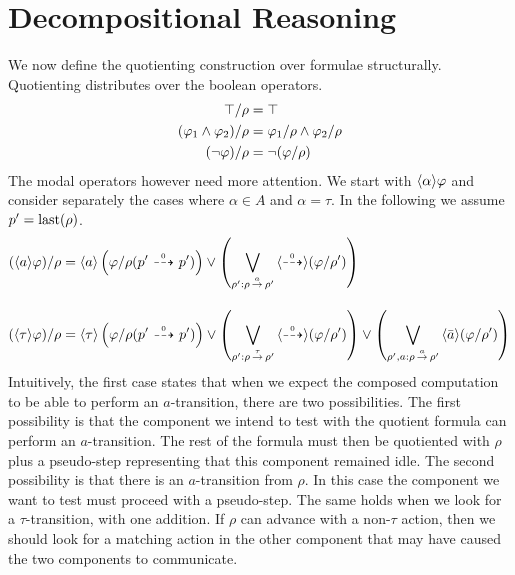 \section{Decompositional Reasoning} %
\label{sec:decomp_hml}

We now define the quotienting construction over formulae structurally. 
Quotienting distributes over the boolean operators.
\begin{align*}
\top / \rho &= \top \\
(\varphi_1 \land \varphi_2)/\rho &= \varphi_1/\rho  \land \varphi_2 / \rho \\
(\neg\varphi)/\rho &= \neg(\varphi/\rho) \\
\end{align*}
The modal operators however need more attention. We start with $\mbox{\ensuremath{\langle \alpha \rangle}}\varphi$
and consider separately the cases where $\alpha\in A$ and $\alpha = \tau$. In
the following we assume $p' = \operatorname{last}(\rho)$.
\begin{align*}
    (\mbox{\ensuremath{\langle a \rangle}}\varphi) / \rho &= \mbox{\ensuremath{\langle a \rangle}} \left(\varphi / \rho(p'\ {\stackrel{_{0}}{\dashrightarrow}}\  p')\right)
        \lor \left(\bigvee_{\rho' : \rho\,{\stackrel{{a}}{\rightarrow}}\,\rho'} \mbox{\ensuremath{\langle\stackrel{_{0}}{\dashrightarrow}\rangle}} (\varphi/\rho') \right)
    \\[1em]
    (\mbox{\ensuremath{\langle \tau \rangle}}\varphi) / \rho &= \mbox{\ensuremath{\langle \tau \rangle}} \left(\varphi / \rho(p'\ {\stackrel{_{0}}{\dashrightarrow}}\  p')\right)
        \lor \left(\bigvee_{\rho' : \rho\,{\stackrel{{\tau}}{\rightarrow}}\,\rho'} \mbox{\ensuremath{\langle\stackrel{_{0}}{\dashrightarrow}\rangle}} (\varphi/\rho') \right)
        \lor \left( \bigvee_{\rho',a : \rho \,{\stackrel{{a}}{\rightarrow}}\, \rho'} \mbox{\ensuremath{\langle \bar{a} \rangle}} (\varphi/\rho')  \right)
\end{align*}
Intuitively, the first case states that when we expect the composed computation to be
able to perform an $a$-transition, there are two possibilities. The first possibility
is that the component
we intend to test with the quotient formula can perform an $a$-transition. The rest of the
formula must then be quotiented with $\rho$ plus a pseudo-step representing that this
component remained idle.
The second possibility is that there is an $a$-transition from $\rho$. In this case
the component we want to test must proceed with a pseudo-step.
The same holds when we look
for a $\tau$-transition, with one addition.  If $\rho$ can advance with a non-$\tau$
action, then we should look for a matching action in the other component that may
have caused the two components to communicate.

